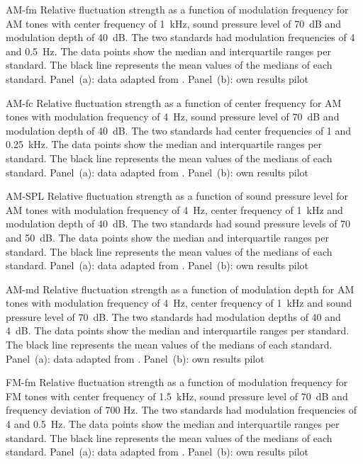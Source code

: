 \documentclass[../main.tex]{subfiles}
\begin{document}
\begin{pilotresults}

\myfigurefastlexpstds%
  {AM-fm}
  {Relative fluctuation strength as a function of modulation frequency for
    \gls{AM} tones with center frequency of 1~kHz, sound pressure level of
    70~dB and modulation depth of 40~dB.  The two standards had modulation
    frequencies of 4 and 0.5~Hz. The data points show the median and
    interquartile ranges per standard. The black line represents the mean values
    of the medians of each standard. Panel~(a): data adapted from
    \cite[pp.248]{Fastl2007Psychoacoustics}. Panel~(b): own results}
  {pilot}

\myfigurefastlexpstds%
  {AM-fc}
  {Relative fluctuation strength as a function of center frequency for
    \gls{AM} tones with modulation frequency of 4~Hz, sound pressure level of
    70~dB and modulation depth of 40~dB.  The two standards had center
    frequencies of 1 and 0.25~kHz. The data points show the median and
    interquartile ranges per standard. The black line represents the mean values
    of the medians of each standard. Panel~(a): data adapted from
    \cite[pp.250]{Fastl2007Psychoacoustics}. Panel~(b): own results}
  {pilot}

\myfigurefastlexpstds%
  {AM-SPL}
  {Relative fluctuation strength as a function of sound pressure level for
    \gls{AM} tones with modulation frequency of 4~Hz, center frequency of 1~kHz
    and modulation depth of 40~dB.  The two standards had sound pressure levels
    of 70 and 50~dB. The data points show the median and
    interquartile ranges per standard. The black line represents the mean values
    of the medians of each standard. Panel~(a): data adapted from
    \cite[pp.249]{Fastl2007Psychoacoustics}. Panel~(b): own results}
  {pilot}

\myfigurefastlexpstds%
  {AM-md}
  {Relative fluctuation strength as a function of modulation depth for
    \gls{AM} tones with modulation frequency of 4~Hz, center frequency of 1~kHz
    and sound pressure level of 70~dB.  The two standards had modulation depths
    of 40 and 4~dB. The data points show the median and
    interquartile ranges per standard. The black line represents the mean values
    of the medians of each standard. Panel~(a): data adapted from
    \cite[pp.249]{Fastl2007Psychoacoustics}. Panel~(b): own results}
  {pilot}

\myfigurefastlexpstds%
  {FM-fm}
  {Relative fluctuation strength as a function of modulation frequency for
    \gls{FM} tones with center frequency of 1.5~kHz, sound pressure level of
    70~dB and frequency deviation of 700 Hz.  The two standards had modulation
    frequencies of 4 and 0.5~Hz. The data points show the median and
    interquartile ranges per standard. The black line represents the mean values
    of the medians of each standard. Panel~(a): data adapted from
    \cite[pp.248]{Fastl2007Psychoacoustics}. Panel~(b): own results}
  {pilot}


\end{pilotresults}
\end{document}
